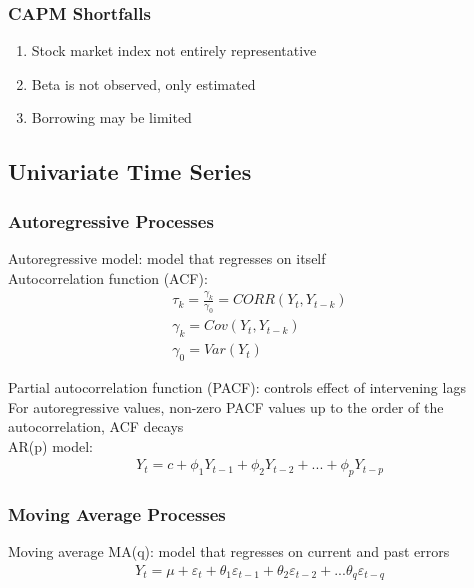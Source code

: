 \documentclass[12pt]{article}
\numberwithin{equation}{section}
\begin{document}
\subsubsection{CAPM Shortfalls}
\begin{enumerate}
    \item Stock market index not entirely representative
    \item Beta is not observed, only estimated
    \item Borrowing may be limited
\end{enumerate}

\subsection{Univariate Time Series}

\subsubsection{Autoregressive Processes}
Autoregressive model: model that regresses on itself \\[0.5cm]
Autocorrelation function (ACF):
\begin{gather}
    \tau_k = \frac{\gamma_k}{\gamma_0} = CORR(Y_t, Y_{t-k}) \\
    \gamma_k = Cov(Y_t, Y_{t-k}) \\
    \gamma_0 = Var(Y_t)
\end{gather}

Partial autocorrelation function (PACF): controls effect of intervening lags \\[0.5cm]
For autoregressive values, non-zero PACF values up to the order of the autocorrelation, ACF decays \\

AR(p) model:
\begin{gather}
    Y_t = c + \phi_1 Y_{t-1} + \phi_2 Y_{t-2} + ... + \phi_p Y_{t-p}
\end{gather}

\subsubsection{Moving Average Processes}
Moving average MA(q): model that regresses on current and past errors
\begin{gather}
    Y_t = \mu + \varepsilon_t + \theta_1 \varepsilon_{t-1} + \theta_2 \varepsilon_{t-2} + ... \theta_q \varepsilon_{t-q}
\end{gather}
\end{document}
